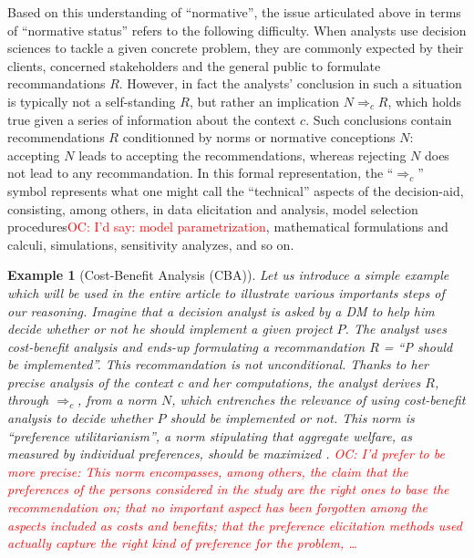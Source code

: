 \documentclass[preprint, french, english, 11pt, authoryear]{elsarticle}%
\newtheorem{example}{Example}
\newcommand{\commentOC}[1]{\textcolor{red}{OC: #1}}
\begin{document}
Based on this understanding of “normative”, the issue articulated above in terms of “normative status” refers to the following difficulty. When analysts use decision sciences to tackle a given concrete problem, they are commonly expected by their clients, concerned stakeholders and the general public to formulate recommandations $R$. However, in fact the analysts' conclusion in such a situation is typically not a self-standing $R$, but rather an implication $N ⇒_c R$, which holds true given a series of information about the context $c$. Such conclusions contain recommendations $R$ conditionned by norms or normative conceptions $N$: accepting  $N$ leads to accepting the recommendations, whereas rejecting $N$ does not lead to any recommandation. In this formal representation, the “$⇒_c $” symbol represents what one might call the “technical” aspects of the decision-aid, consisting, among others, in data elicitation and analysis, model selection procedures\commentOC{I’d say: model parametrization}, mathematical formulations and calculi, simulations, sensitivity analyzes, and so on.

\begin{example}[Cost-Benefit Analysis (CBA)]
Let us introduce a simple example which will be used in the entire article to illustrate various importants steps of our reasoning. Imagine that a decision analyst is asked by a \ac{DM} to help him decide whether or not he should implement a given project $P$. The analyst uses cost-benefit analysis \citep{layard_cost-benefit_1994} and ends-up formulating a recommandation $R$ = “P should be implemented”. This recommandation is not unconditional. Thanks to her precise analysis of the context $c$ and her computations, the analyst derives $R$, through $⇒_c $, from a norm $N$, which entrenches the relevance of using cost-benefit analysis to decide whether $P$ should be implemented or not. This norm is “preference utilitarianism”, a norm stipulating that aggregate welfare, as measured by individual preferences, should be maximized  \citep{meinard_ethical_2016}. \commentOC{I’d prefer to be more precise: This norm encompasses, among others, the claim that the preferences of the persons considered in the study are the right ones to base the recommendation on; that no important aspect has been forgotten among the aspects included as costs and benefits; that the preference elicitation methods used actually capture the right kind of preference for the problem, …}
\end{example}
\end{document}

